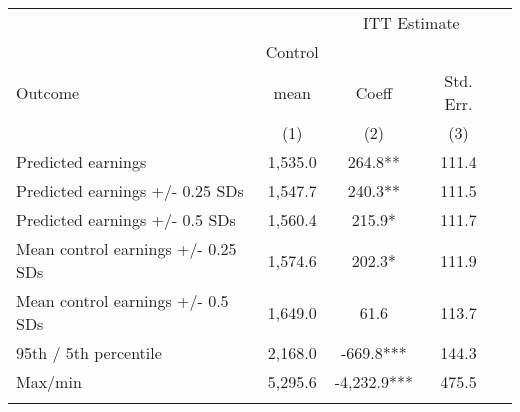 \begin{tabular}{lcccc}
\hline \noalign{\smallskip} &  & \multicolumn{2}{c}{{ ITT Estimate}} & \\
\cline{3-4} & Control &  &  & \\
Outcome & mean & Coeff & Std. Err. & \\
 & (1) & (2) & (3) & \\
\noalign{\smallskip}\hline \noalign{\smallskip}Predicted earnings & 1,535.0 & 264.8** & 111.4 & \\
Predicted earnings +/- 0.25 SDs & 1,547.7 & 240.3** & 111.5 & \\
Predicted earnings +/- 0.5 SDs & 1,560.4 & 215.9* & 111.7 & \\
Mean control earnings +/- 0.25 SDs & 1,574.6 & 202.3* & 111.9 & \\
Mean control earnings +/- 0.5 SDs & 1,649.0 & 61.6 & 113.7 & \\
95th / 5th percentile & 2,168.0 & -669.8*** & 144.3 & \\
Max/min & 5,295.6 & -4,232.9*** & 475.5 & \\
\noalign{\smallskip}\hline\end{tabular}\\
